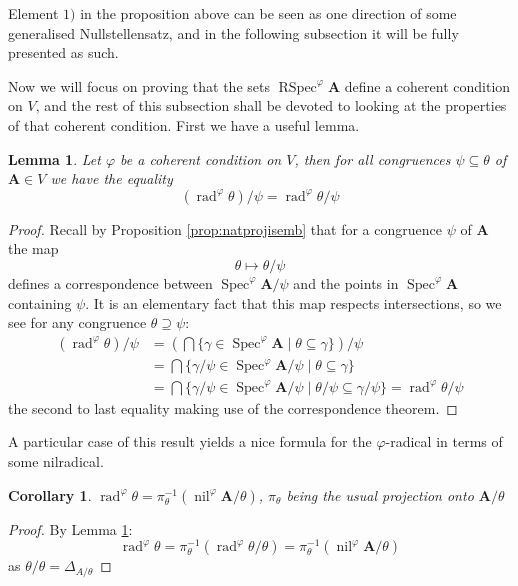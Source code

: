 \documentclass{article}
\theoremstyle{plain}
\newtheorem{lemma}[theorem]{Lemma}
\newtheorem{corollary}[theorem]{Corollary}
\theoremstyle{definition}
\newcommand{\Spec}{\operatorname{Spec}}
\newcommand{\RSpec}{\operatorname{RSpec}}
\newcommand{\nil}{\operatorname{nil}}
\newcommand{\rad}{\operatorname{rad}}
\begin{document}
Element $1)$ in the proposition above can be seen as one direction of some generalised Nullstellensatz, and in the following subsection it will be fully presented as such.\par
Now we will focus on proving that the sets $\RSpec^\varphi\mathbf{A}$ define a coherent condition on $V$, and the rest of this subsection shall be devoted to looking at the properties of that coherent condition.
First we have a useful lemma.

\begin{lemma} \label{lem:radicalcommuteswithquot}
    Let $\varphi$ be a coherent condition on $V$, then for all congruences $\psi\subseteq\theta$ of $\mathbf{A} \in V$ we have the equality
    $$(\rad^\varphi\theta)/\psi = \rad^\varphi\theta/\psi$$
\end{lemma}
\begin{proof}
    Recall by Proposition \ref{prop:natprojisemb} that for a congruence $\psi$ of $\mathbf{A}$ the map
    $$\theta \mapsto \theta/\psi$$
    defines a correspondence between $\Spec^\varphi\mathbf{A}/\psi$ and the points in $\Spec^\varphi\mathbf{A}$ containing $\psi$.
    It is an elementary fact that this map respects intersections, so we see for any congruence $\theta \supseteq \psi$:
    \begin{align*}
        (\rad^\varphi\theta)/\psi &= (\bigcap \{ \gamma \in \Spec^\varphi\mathbf{A} \mid \theta \subseteq \gamma \}) / \psi\\
        &= \bigcap \{ \gamma/\psi \in \Spec^\varphi\mathbf{A}/\psi \mid \theta \subseteq \gamma \}\\
        &= \bigcap \{ \gamma/\psi \in \Spec^\varphi\mathbf{A}/\psi \mid \theta/\psi \subseteq \gamma/\psi \} = \rad^\varphi\theta/\psi
    \end{align*}
    the second to last equality making use of the correspondence theorem.
\end{proof}

A particular case of this result yields a nice formula for the $\varphi$-radical in terms of some nilradical.

\begin{corollary}
    $\rad^\varphi\theta = \pi_\theta^{-1}(\nil^\varphi\mathbf{A}/\theta)$,
    $\pi_\theta$ being the usual projection onto $\mathbf{A}/\theta$
\end{corollary}
\begin{proof}
    By Lemma \ref{lem:radicalcommuteswithquot}:
    $$\rad^\varphi\theta = \pi_\theta^{-1}(\rad^\varphi\theta/\theta) = \pi_\theta^{-1}(\nil^\varphi\mathbf{A}/\theta)$$
    as $\theta/\theta = \Delta_{A/\theta}$
\end{proof}
\end{document}
